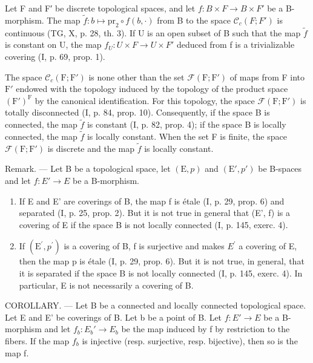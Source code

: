 Let F and F′ be discrete topological spaces, and let \(f: B \times F \to B \times F'\) be a B-morphism. The map \(\widetilde{f}: b \mapsto \mathrm{pr}_{2} \circ f(b, \cdot)\) from B to the space \(\mathcal{C}_{c}(F; F')\) is continuous (TG, X, p. 28, th. 3). If U is an open subset of B such that the map \(\widetilde{f}\) is constant on U, the map \(f_{U}: U \times F \to U \times F'\) deduced from f is a trivializable covering (I, p. 69, prop. 1).

The space \(\mathcal{C}_c(\mathrm{F};\mathrm{F}')\) is none other than the set \(\mathcal{F}(\mathrm{F};\mathrm{F}')\) of maps from F into \(\mathrm{F}'\) endowed with the topology induced by the topology of the product space \((\mathrm{F}')^{\mathrm{F}}\) by the canonical identification. For this topology, the space \(\mathcal{F}(\mathrm{F};\mathrm{F}')\) is totally disconnected (I, p. 84, prop. 10). Consequently, if the space B is connected, the map \(\widetilde{f}\) is constant (I, p. 82, prop. 4); if the space B is locally connected, the map \(\widetilde{f}\) is locally constant. When the set F is finite, the space \(\mathcal{F}(\mathrm{F};\mathrm{F}')\) is discrete and the map \(\widetilde{f}\) is locally constant.

Remark. --- Let B be a topological space, let \((\mathrm{E}, p)\) and \((\mathrm{E}', p')\) be B-spaces and let \(f: E' \to E\) be a B-morphism.

\begin{enumerate}
\def\labelenumi{\alph{enumi})}
\item
  If E and E' are coverings of B, the map f is étale (I, p. 29, prop. 6) and separated (I, p. 25, prop. 2). But it is not true in general that (E', f) is a covering of E if the space B is not locally connected (I, p. 145, exerc. 4).
\item
  If \((\mathrm{E}^{\prime}, p^{\prime})\) is a covering of B, f is surjective and makes \(E^{\prime}\) a covering of E, then the map p is étale (I, p. 29, prop. 6). But it is not true, in general, that it is separated if the space B is not locally connected (I, p. 145, exerc. 4). In particular, E is not necessarily a covering of B.
\end{enumerate}

COROLLARY. --- Let B be a connected and locally connected topological space. Let E and E' be coverings of B. Let b be a point of B. Let \(f: E' \to E\) be a B-morphism and let \(f_{b}: E_{b}' \to E_{b}\) be the map induced by f by restriction to the fibers. If the map \(f_{b}\) is injective (resp. surjective, resp. bijective), then so is the map f.

